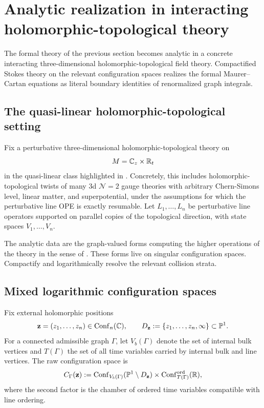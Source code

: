 \section{Analytic realization in interacting holomorphic-topological theory}\label{sec:analytic}

The formal theory of the previous section becomes analytic in a concrete interacting three-dimensional holomorphic-topological field theory. Compactified Stokes theory on the relevant configuration spaces realizes the formal Maurer--Cartan equations as literal boundary identities of renormalized graph integrals.

\subsection{The quasi-linear holomorphic-topological setting}
Fix a perturbative three-dimensional holomorphic-topological theory on
\[
 M=\mathbb C_z\times \mathbb R_t
\]
in the quasi-linear class highlighted in \cite{DNP25}. Concretely, this includes holomorphic-topological twists of many $3$d $\mathcal N=2$ gauge theories with arbitrary Chern-Simons level, linear matter, and superpotential, under the assumptions for which the perturbative line OPE is exactly resumable. Let $L_1,\dots,L_n$ be perturbative line operators supported on parallel copies of the topological direction, with state spaces $V_1,\dots,V_n$.

The analytic data are the graph-valued forms computing the higher operations of the theory in the sense of \cite{GKW25,DNP25}. These forms live on singular configuration spaces. Compactify and logarithmically resolve the relevant collision strata.

\subsection{Mixed logarithmic configuration spaces}
Fix external holomorphic positions
\[
 \mathbf z=(z_1,\dots,z_n)\in \mathrm{Conf}_n(\mathbb C),
 \qquad
 D_{\mathbf z}:=\{z_1,\dots,z_n,\infty\}\subset \mathbb P^1.
\]
For a connected admissible graph $\Gamma$, let $V_b(\Gamma)$ denote the set of internal bulk vertices and $T(\Gamma)$ the set of all time variables carried by internal bulk and line vertices. The raw configuration space is
\[
 C_\Gamma(\mathbf z)
 :=
 \mathrm{Conf}_{V_b(\Gamma)}(\mathbb P^1\setminus D_{\mathbf z})
 \times
 \mathrm{Conf}_{T(\Gamma)}^{\mathrm{ord}}(\mathbb R),
\]
where the second factor is the chamber of ordered time variables compatible with line ordering.

